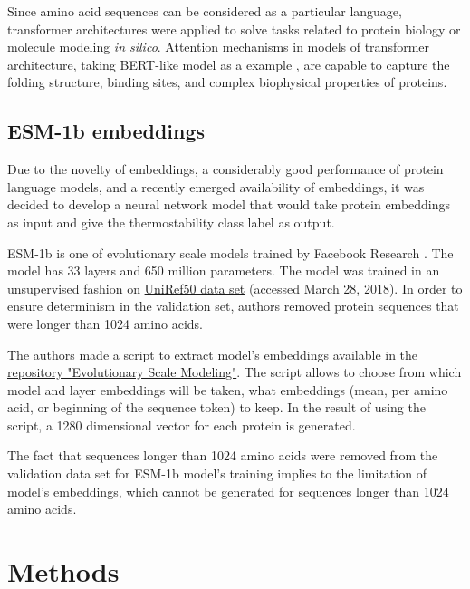 \documentclass[12pt]{article}
\begin{document}
	Since amino acid sequences can be considered as a particular language, 
	transformer architectures were applied to solve tasks related to protein 
	biology or molecule modeling \textit{in silico}. Attention mechanisms in 
	models of transformer architecture, taking BERT-like model as a example 
	\cite{vig2020bertology}, are capable to capture the folding structure, 
	binding sites, and complex biophysical properties of proteins.

	\subsection{ESM-1b embeddings}

	Due to the novelty of embeddings, a considerably good performance of
	protein language models, and a recently emerged availability of embeddings,
	it was decided to develop a neural network model that would take protein
	embeddings as input and give the thermostability class
	label as output.

	ESM-1b is one of evolutionary scale models trained by Facebook Research 
	\cite{rives2021biological}. The model has 33 layers and 650 million parameters. 
	The model was trained in an 
	unsupervised fashion on 
	\href{ftp://ftp.uniprot.org/pub/databases/uniprot/uniref/uniref50}{UniRef50 data set}
	(accessed March 28, 2018)\cite{suzek2015uniref}. In order 
	to ensure
	determinism in the validation set, authors removed protein sequences that
	were longer than 1024 amino acids. 

	The authors made a script to extract model's embeddings available in the 
	\href{https://github.com/facebookresearch/esm}{repository "Evolutionary Scale Modeling"}.
	The script allows to choose 
	from which model and layer embeddings will be taken, what embeddings 
	(mean, per amino acid, or beginning of the sequence token) to keep. In the
	result of using the script, a 1280 dimensional vector for each protein is 
	generated.
	
	The fact that sequences longer than 1024 amino acids were removed from the 
	validation data set for ESM-1b model's training implies to the limitation of 
	model's embeddings, which cannot be generated for sequences longer than 
	1024 amino acids.

	\newpage

	\section{Methods}
\end{document}
